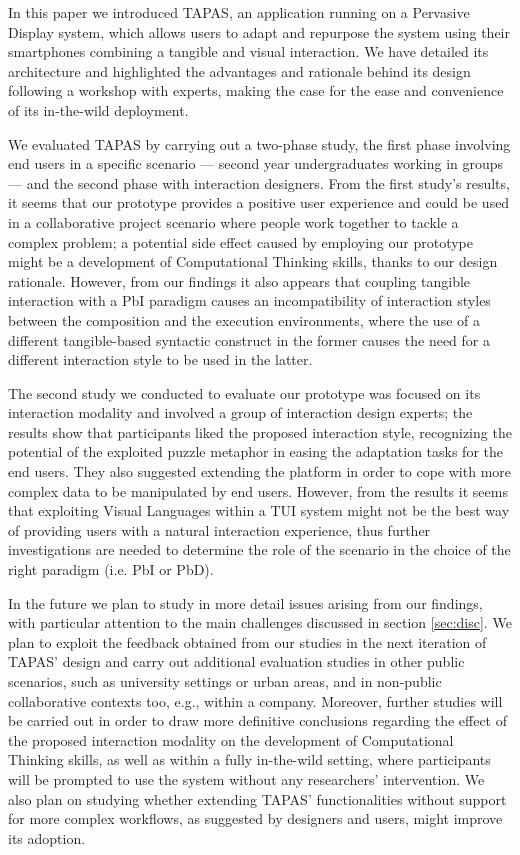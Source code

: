 In this paper we introduced \acs{TAPAS}, an application running on a Pervasive Display system, which allows users to adapt and repurpose the system using their smartphones combining a tangible and visual interaction. We have detailed its architecture and highlighted the advantages and rationale behind its design following a workshop with experts, making the case for the ease and convenience of its in-the-wild deployment.

We evaluated \acs{TAPAS} by carrying out a two-phase study, the first phase involving end users in a specific scenario --- second year undergraduates working in groups --- and the second phase with interaction designers. From the first study's results, it seems that our prototype provides a positive user experience and could be used in a collaborative project scenario where people work together to tackle a complex problem; a potential side effect caused by employing our prototype might be a development of Computational Thinking skills, thanks to our design rationale. However, from our findings it also appears that coupling tangible interaction with a \acl{PbI} paradigm causes an incompatibility of interaction styles between the composition and the execution environments, where the use of a different tangible-based syntactic construct in the former causes the need for a different interaction style to be used in the latter.

The second study we conducted to evaluate our prototype was focused on its interaction modality and involved a group of interaction design experts; the results show that participants liked the proposed interaction style, recognizing the potential of the exploited puzzle metaphor in easing the adaptation tasks for the end users. They also suggested extending the platform in order to cope with more complex data to be manipulated by end users. However, from the results it seems that exploiting Visual Languages within a \acl{TUI} system might not be the best way of providing users with a natural interaction experience, thus further investigations are needed to determine the role of the scenario in the choice of the right paradigm (i.e. \acl{PbI} or \acl{PbD}).

In the future we plan to study in more detail issues arising from our findings, with particular attention to the main challenges discussed in section \ref{sec:disc}. We plan to exploit the feedback obtained from our studies in the next iteration of \acs{TAPAS}' design and carry out additional evaluation studies in other public scenarios, such as university settings or urban areas, and in non-public collaborative contexts too, e.g., within a company. Moreover, further studies will be carried out in order to draw more definitive conclusions regarding the effect of the proposed interaction modality on the development of Computational Thinking skills, as well as within a fully in-the-wild setting, where participants will be prompted to use the system without any researchers' intervention. We also plan on studying whether extending \acs{TAPAS}' functionalities without support for more complex workflows, as suggested by designers and users, might improve its adoption.